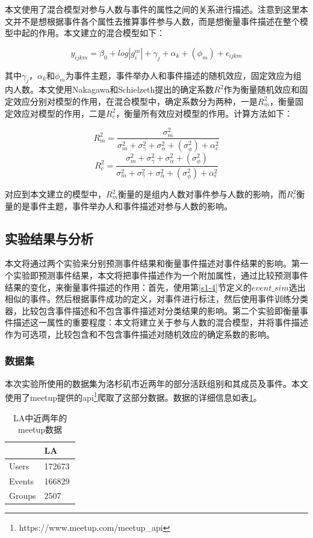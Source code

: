 本文使用了混合模型对参与人数与事件的属性之间的关系进行描述。注意到这里本文并不是想根据事件各个属性去推算事件参与人数，而是想衡量事件描述在整个模型中起的作用。本文建立的混合模型如下：

\begin{equation}
y_{ijkm}=\beta_0+log|g_i^m|+\gamma_j+\alpha_k+ (\phi_m) +\epsilon_{ijkm}
\end{equation}

其中\(\gamma_j\)，\(\alpha_k\)和\(\phi_m\)为事件主题，事件举办人和事件描述的随机效应，固定效应为组内人数。本文使用Nakagawa和Schielzeth提出的确定系数\(R^2\)作为衡量随机效应和固定效应分别对模型的作用，在混合模型中，确定系数分为两种，一是\(R_m^2\)，衡量固定效应对模型的作用，二是\(R_c^2\)，衡量所有效应对模型的作用。计算方法如下：

\begin{equation}
R_m^2=\frac{\sigma_m^2}{\sigma_m^2+\sigma_\gamma^2+\sigma_\alpha^2+(\sigma_\phi^2)+\alpha_\epsilon^2}
\end{equation}
\begin{equation}
R_c^2=\frac{\sigma_m^2+\sigma_\gamma^2+\sigma_\alpha^2+(\sigma_\phi^2)}{\sigma_m^2+\sigma_\gamma^2+\sigma_\alpha^2+(\sigma_\phi^2)+\alpha_\epsilon^2}
\end{equation}

对应到本文建立的模型中，\(R_m^2\)衡量的是组内人数对事件参与人数的影响，而\(R_c^2\)衡量的是事件主题，事件举办人和事件描述对参与人数的影响。

\subsection{实验结果与分析}
本文将通过两个实验来分别预测事件结果和衡量事件描述对事件结果的影响。第一个实验即预测事件结果，本文将把事件描述作为一个附加属性，通过比较预测事件结果的变化，来衡量事件描述的作用：首先，使用第\ref{s1-4}节定义的\(event\_sim\)选出相似的事件。然后根据事件成功的定义，对事件进行标注，然后使用事件训练分类器，比较包含事件描述和不包含事件描述对分类结果的影响。第二个实验即衡量事件描述这一属性的重要程度：本文将建立关于参与人数的混合模型，并将事件描述作为可选项，比较包含和不包含事件描述对随机效应的确定系数的影响。

\subsubsection{数据集}
本次实验所使用的数据集为洛杉矶市近两年的部分活跃组别和其成员及事件。本文使用了meetup提供的api\footnote{https://www.meetup.com/meetup\_api}爬取了这部分数据。数据的详细信息如表\ref{t1-1}。
\begin{table}[htbp] 
  \centering  
  \caption{\label{t1-1}LA中近两年的meetup数据}
    \begin{tabular*}{\linewidth}{p{0.5\linewidth}p{0.5\linewidth}}
\toprule
    & LA \\
\midrule
    Users & 172673\\
    Events & 166829\\
    Groups & 2507\\
\bottomrule
    \end{tabular*}
\end{table}

